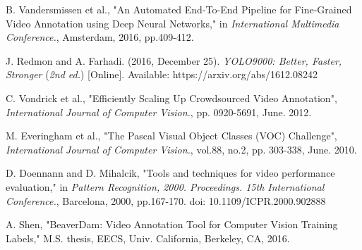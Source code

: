 \documentclass[conference]{IEEEtran}
\begin{document}
%
%

%
%

\begin{thebibliography}{9}

B. Vandersmissen et al., "An Automated End-To-End Pipeline for Fine-Grained Video Annotation using Deep Neural Networks," in 
\textit{International Multimedia Conference.}, Amsterdam, 2016, pp.409-412.
 
J. Redmon and A. Farhadi. (2016, December 25). 
\textit{YOLO9000: Better, Faster, Stronger} (\textit{2nd ed.}) [Online]. Available: https://arxiv.org/abs/1612.08242

C. Vondrick et al., "Efficiently Scaling Up Crowdsourced Video Annotation", \textit{International Journal of Computer Vision.}, pp. 0920-5691, June. 2012.

M. Everingham et al., "The Pascal Visual Object Classes (VOC) Challenge", \textit{International Journal of Computer Vision.}, vol.88, no.2, pp. 303-338, June. 2010.

D. Doennann and D. Mihalcik, "Tools and techniques for video performance evaluation," in 
\textit{Pattern Recognition, 2000. Proceedings. 15th International Conference.}, Barcelona, 2000, pp.167-170. doi: 10.1109/ICPR.2000.902888
    
A. Shen, "BeaverDam: Video Annotation Tool for Computer Vision Training Labels," M.S. thesis, EECS, Univ. California, Berkeley, CA, 2016.

\end{thebibliography}
\end{document}
